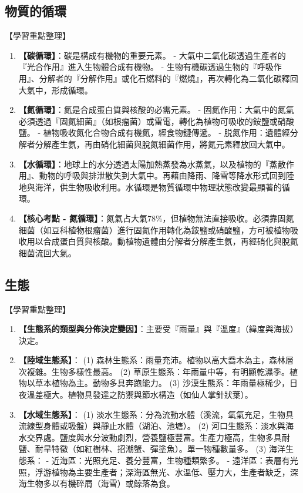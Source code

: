\documentclass[11pt,a4paper]{article}
\begin{document}
\subsection{物質的循環}
\begin{learningpoints}{【學習重點整理】}
\begin{enumerate}[label=\arabic*.]
  \item \textbf{【碳循環】}：碳是構成有機物的重要元素。
  - 大氣中二氧化碳透過生產者的『光合作用』進入生物體合成有機物。
  - 生物有機碳透過生物的『呼吸作用』、分解者的『分解作用』或化石燃料的『燃燒』，再次轉化為二氧化碳釋回大氣中，形成循環。
  \item \textbf{【氮循環】}：氮是合成蛋白質與核酸的必需元素。
  - 固氮作用：大氣中的氮氣必須透過『固氮細菌』（如根瘤菌）或雷電，轉化為植物可吸收的銨鹽或硝酸鹽。
  - 植物吸收氮化合物合成有機氮，經食物鏈傳遞。
  - 脱氮作用：遺體經分解者分解產生氨，再由硝化細菌與脫氮細菌作用，將氮元素釋放回大氣中。
  \item \textbf{【水循環】}：地球上的水分透過太陽加熱蒸發為水蒸氣，以及植物的『蒸散作用』、動物的呼吸與排泄散失到大氣中。再藉由降雨、降雪等降水形式回到陸地與海洋，供生物吸收利用。水循環是物質循環中物理狀態改變最顯著的循環。
  \item \textbf{【核心考點 - 氮循環】}：氮氣占大氣78\%，但植物無法直接吸收。必須靠固氮細菌（如豆科植物根瘤菌）進行固氮作用轉化為銨鹽或硝酸鹽，方可被植物吸收用以合成蛋白質與核酸。動植物遺體由分解者分解產生氨，再經硝化與脫氮細菌流回大氣。
\end{enumerate}
\end{learningpoints}

\subsection{生態}
\begin{learningpoints}{【學習重點整理】}
\begin{enumerate}[label=\arabic*.]
  \item \textbf{【生態系的類型與分佈決定變因】}：主要受『雨量』與『溫度』（緯度與海拔）決定。
  \item \textbf{【陸域生態系】}：
  (1) 森林生態系：雨量充沛。植物以高大喬木為主，森林層次複雜。生物多樣性最高。
  (2) 草原生態系：年雨量中等，有明顯乾濕季。植物以草本植物為主。動物多具奔跑能力。
  (3) 沙漠生態系：年雨量極稀少，日夜溫差極大。植物具發達之防禦與節水構造（如仙人掌針狀葉）。
  \item \textbf{【水域生態系】}：
  (1) 淡水生態系：分為流動水體（溪流，氧氣充足，生物具流線型身體或吸盤）與靜止水體（湖泊、池塘）。
  (2) 河口生態系：淡水與海水交界處。鹽度與水分波動劇烈，營養鹽極豐富。生產力極高，生物多具耐鹽、耐旱特徵（如紅樹林、招潮蟹、彈塗魚）。單一物種數量多。
  (3) 海洋生態系：
     - 近海區：光照充足、養分豐富，生物種類繁多。
     - 遠洋區：表層有光照，浮游植物為主要生產者；深海區無光、水溫低、壓力大，生產者缺乏，深海生物多以有機碎屑（海雪）或鯨落為食。
\end{enumerate}
\end{learningpoints}
\end{document}
